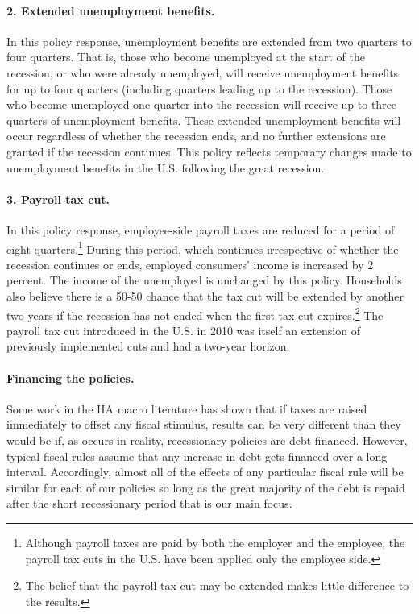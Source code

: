 \documentclass[qe]{econsocart}
\begin{document}
\paragraph{2.
  Extended unemployment benefits.} In this policy response, unemployment benefits are extended from two quarters to four quarters.
That is, those who become unemployed at the start of the recession, or who were already unemployed, will receive unemployment benefits for up to four quarters (including quarters leading up to the recession).
Those who become unemployed one quarter into the recession will receive up to three quarters of unemployment benefits.
These extended unemployment benefits will occur regardless of whether the recession ends, and no further extensions are granted if the recession continues.
This policy reflects temporary changes made to unemployment benefits in the U.S.
following the great recession.

\paragraph{3.
  Payroll tax cut.} In this policy response, employee-side payroll taxes are reduced for a period of eight quarters.\footnote{Although payroll taxes are paid by both the employer and the employee, the payroll tax cuts in the U.S.
  have been applied only the employee side.} During this period, which continues irrespective of whether the recession continues or ends, employed consumers' income is increased by 2 percent.
The income of the unemployed is unchanged by this policy.
Households also believe there is a 50-50 chance that the tax cut will be extended by another two years if the recession has not ended when the first tax cut expires.\footnote{The belief that the payroll tax cut may be extended makes little difference to the results.} The payroll tax cut introduced in the U.S.
in 2010 was itself an extension of previously implemented cuts and had a two-year horizon.

\paragraph{Financing the policies.} Some work in the HA macro literature has shown that if taxes are raised immediately to offset any fiscal stimulus, results can be very different than they would be if, as occurs in reality, recessionary policies are debt financed.
However, typical fiscal rules assume that any increase in debt gets financed over a long interval.
Accordingly, almost all of the effects of any particular fiscal rule will be  similar for each of our policies so long as the great majority of the debt is repaid after the short recessionary period that is our main focus.
\end{document}
